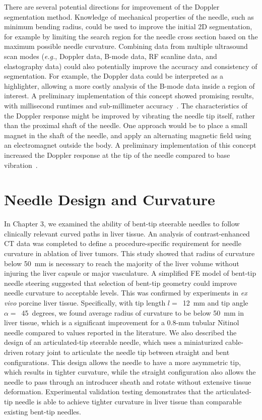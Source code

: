 There are several potential directions for improvement of the Doppler segmentation method. Knowledge of mechanical properties of the needle, such as minimum bending radius, could be used to improve the initial 2D segmentation, for example by limiting the search region for the needle cross section based on the maximum possible needle curvature. Combining data from multiple ultrasound scan modes (\textit{e.g.}, Doppler data, B-mode data, RF scanline data, and elastography data) could also potentially improve the accuracy and consistency of segmentation. For example, the Doppler data could be interpreted as a highlighter, allowing a more costly analysis of the B-mode data inside a region of interest. A preliminary implementation of this concept showed promising results, with millisecond runtimes and sub-millimeter accuracy~\cite{Greer2014}. The characteristics of the Doppler response might be improved by vibrating the needle tip itself, rather than the proximal shaft of the needle. One approach would be to place a small magnet in the shaft of the needle, and apply an alternating magnetic field using an electromagnet outside the body. A preliminary implementation of this concept increased the Doppler response at the tip of the needle compared to base vibration~\cite{Cabreros2014}.

\section{Needle Design and Curvature}
In Chapter 3, we examined the ability of bent-tip steerable needles to follow clinically relevant curved paths in liver tissue. An analysis of contrast-enhanced CT data was completed to define a procedure-specific requirement for needle curvature in ablation of liver tumors. This study showed that radius of curvature below 50~mm is necessary to reach the majority of the liver volume without injuring the liver capsule or major vasculature. A simplified FE model of bent-tip needle steering suggested that selection of bent-tip geometry could improve needle curvature to acceptable levels. This was confirmed by experiments in \textit{ex vivo} porcine liver tissue. Specifically, with tip length $l =$~12~mm and tip angle $\alpha =$~45~degrees, we found average radius of curvature to be below 50~mm in liver tissue, which is a significant improvement for a 0.8-mm tubular Nitinol needle compared to values reported in the literature. We also described the design of an articulated-tip steerable needle, which uses a miniaturized cable-driven rotary joint to articulate the needle tip between straight and bent configurations. This design allows the needle to have a more asymmetric tip, which results in tighter curvature, while the straight configuration also allows the needle to pass through an introducer sheath and rotate without extensive tissue deformation. Experimental validation testing demonstrates that the articulated-tip needle is able to achieve tighter curvature in liver tissue than comparable existing bent-tip needles. 

